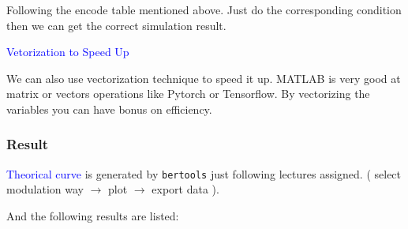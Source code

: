\documentclass{article}
\begin{document}
Following the encode table mentioned above. Just do the corresponding condition then we can get the correct simulation result.

\textcolor{blue}{Vetorization to Speed Up}

We can also use vectorization technique to speed it up. MATLAB is very good at matrix or vectors operations like Pytorch or Tensorflow. By vectorizing the variables you can have bonus on efficiency.

\subsubsection{Result}

\textcolor{blue}{Theorical curve} is generated by \lstinline|bertools| just following lectures assigned. ( select modulation way $ \rightarrow $ plot $ \rightarrow $ export data ).

And the following results are listed:
\end{document}
